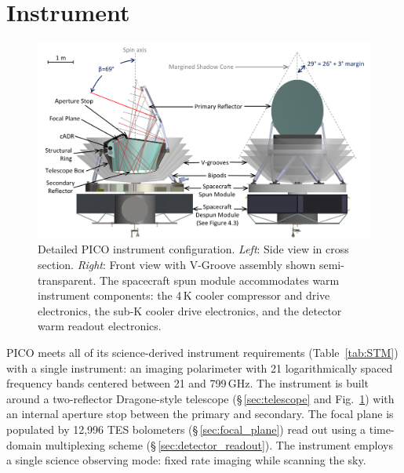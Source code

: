 \newcommand\pdeg{.\!\!\degree}
\newcommand\parcm{.\!\!'}

\section{Instrument}
\label{sec:instrument} %

\begin{figure}
\begin{center}
\includegraphics[width=6.25in]{figures/InstrumentCAD.png}
\vspace{-0.1in}
\caption{\captiontext 
Detailed PICO instrument configuration. \textit{Left}: Side view in cross section. \textit{Right}: Front view with V-Groove assembly shown semi-transparent.  The spacecraft spun module accommodates warm instrument components: the 4\,K cooler compressor and drive electronics, the sub-K cooler drive electronics, and the detector warm readout electronics.
\label{fig:InstrumentCAD}}
\end{center}
\vspace{-0.15in}
\end{figure}

PICO meets all of its science-derived instrument requirements (Table~\ref{tab:STM}) with a single instrument: an imaging polarimeter with 21 logarithmically spaced frequency bands centered between 21 and 799\,GHz. The instrument is built around a two-reflector Dragone-style telescope (\S\,\ref{sec:telescope} and Fig.~\ref{fig:InstrumentCAD}) with an internal aperture stop between the primary and secondary. The focal plane is populated by 12,996 \ac{TES} bolometers (\S\,\ref{sec:focal_plane}) read out using a time-domain multiplexing scheme (\S\,\ref{sec:detector_readout}). The instrument employs a single science observing mode: fixed rate imaging while scanning the sky. 

